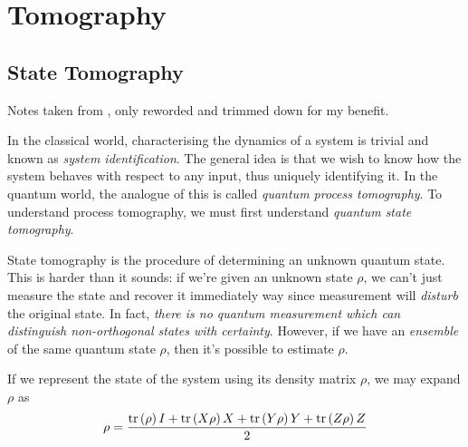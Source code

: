 \section{Tomography}

\subsection{State Tomography}

Notes taken from \cite{nielsen_quantum_2011}, only reworded and trimmed down for my benefit.

In the classical world, characterising the dynamics of a system is trivial and known as
\textit{system identification}. The general idea is that we wish to know how the system behaves with
respect to any input, thus uniquely identifying it. In the quantum world, the analogue of this is
called \textit{quantum process tomography}. To understand process tomography, we must first
understand \textit{quantum state tomography}.

State tomography is the procedure of determining an unknown quantum state. This is harder than it
sounds: if we're given an unknown state $\rho$, we can't just measure the state and recover it
immediately way since measurement will \textit{disturb} the original state. In fact, \textit{there
is no quantum measurement which can distinguish non-orthogonal states with certainty}. However, if
we have an \textit{ensemble} of the same quantum state $\rho$, then it's possible to estimate
$\rho$.

If we represent the state of the system using its density matrix $\rho$, we may expand $\rho$ as
\begin{equation}
    \rho = \frac{\text{tr}\left(\rho\right)I + \text{tr}\left(X\rho\right)X + \text{tr}\left(Y\rho\right)Y + \text{tr}\left(Z\rho\right)Z}
                {2}
\end{equation}

